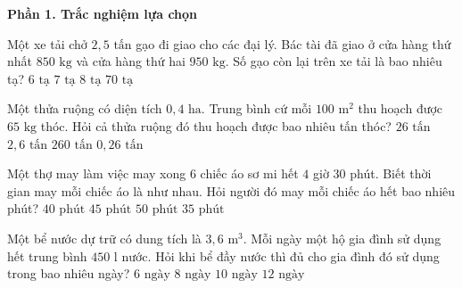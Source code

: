 \textbf{Phần 1. Trắc nghiệm lựa chọn}

\begin{ex} %
Một xe tải chở $2{,}5\text{ tấn}$ gạo đi giao cho các đại lý. Bác tài đã giao ở cửa hàng thứ nhất $850\text{ kg}$ và cửa hàng thứ hai $950\text{ kg}$. Số gạo còn lại trên xe tải là bao nhiêu tạ?
\choice
{$6\text{ tạ}$}
{\True $7\text{ tạ}$}
{$8\text{ tạ}$}
{$70\text{ tạ}$}
\end{ex}

\begin{ex} %
Một thửa ruộng có diện tích $0{,}4\text{ ha}$. Trung bình cứ mỗi $100\text{ m}^2$ thu hoạch được $65\text{ kg}$ thóc. Hỏi cả thửa ruộng đó thu hoạch được bao nhiêu tấn thóc?
\choice
{$26\text{ tấn}$}
{\True $2{,}6\text{ tấn}$}
{$260\text{ tấn}$}
{$0{,}26\text{ tấn}$}
\end{ex}

\begin{ex} %
Một thợ may làm việc may xong $6$ chiếc áo sơ mi hết $4$ giờ $30$ phút. Biết thời gian may mỗi chiếc áo là như nhau. Hỏi người đó may mỗi chiếc áo hết bao nhiêu phút?
\choice
{$40\text{ phút}$}
{\True $45\text{ phút}$}
{$50\text{ phút}$}
{$35\text{ phút}$}
\end{ex}

\begin{ex} %
Một bể nước dự trữ có dung tích là $3{,}6\text{ m}^3$. Mỗi ngày một hộ gia đình sử dụng hết trung bình $450\text{ l}$ nước. Hỏi khi bể đầy nước thì đủ cho gia đình đó sử dụng trong bao nhiêu ngày?
\choice
{$6\text{ ngày}$}
{\True $8\text{ ngày}$}
{$10\text{ ngày}$}
{$12\text{ ngày}$}
\end{ex}

